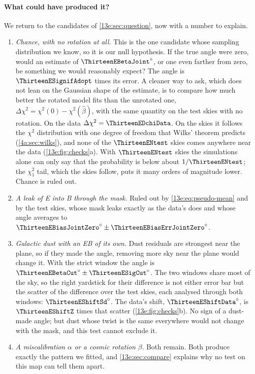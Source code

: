 \paragraph{What could have produced it?} We return to the candidates of \cref{13e:sec:question}, now with a
number to explain.
\begin{enumerate}[itemsep=2pt,leftmargin=1.5em]
  \item \emph{Chance, with no rotation at all.} This is the one candidate whose sampling distribution we know,
        so it is our null hypothesis. If the true angle were zero, would an estimate of
        $\ThirteenEBetaJoint^\circ$, or one even farther from zero, be something we would reasonably expect?
        The angle is $\ThirteenESignifAdopt$ times its error. A cleaner way to ask, which does not lean on the
        Gaussian shape of the estimate, is to compare how much better the rotated model fits than the
        unrotated one, $\Delta\chi^2=\chi^2(0)-\chi^2(\hat\beta)$, with the same quantity on the test skies with no
        rotation. On the data $\Delta\chi^2=\ThirteenEDchiData$. On the skies it follows the $\chi^2$ distribution
        with one degree of freedom that Wilks' theorem predicts (\cref{4a:sec:wilks}), and none of the
        $\ThirteenENtest$ skies comes anywhere near the data (\cref{13e:fig:checks}a). With $\ThirteenENtest$ skies
        the simulations alone can only say that the probability is below about $1/\ThirteenENtest$; the $\chi^2_1$ tail,
        which the skies follow, puts it many orders of magnitude lower. Chance is ruled out.
  \item \emph{A leak of E into B through the mask.} Ruled out by \eqref{13e:eq:pseudo-mean} and by the test
        skies, whose mask leaks exactly as the data's does and whose angle averages to
        $\ThirteenEBiasJointZero^\circ\pm\ThirteenEBiasErrJointZero^\circ$.
  \item \emph{Galactic dust with an EB of its own.} Dust residuals are strongest near the plane, so if they made
        the angle, removing more sky near the plane would change it. With the strict window the angle is
        $\ThirteenEBetaCut^\circ\pm\ThirteenESigCut^\circ$. The two windows share most of the sky, so the right yardstick for
        their difference is not either error bar but the scatter of the difference over the test skies, each
        analysed through both windows: $\ThirteenEShiftSd^\circ$. The data's shift, $\ThirteenEShiftData^\circ$, is
        $\ThirteenEShiftZ$ times that scatter (\cref{13e:fig:checks}b). No sign of a dust-made angle; but dust
        whose twist is the same everywhere would not change with the mask, and this test cannot exclude it.
  \item \emph{A miscalibration $\alpha$ or a cosmic rotation $\beta$.} Both remain. Both produce exactly the
        pattern we fitted, and \cref{13e:sec:compare} explains why no test on this map can tell them apart.
\end{enumerate}

